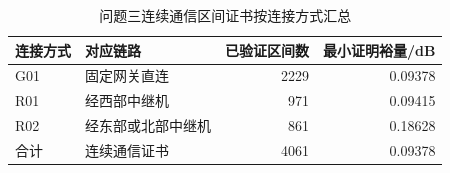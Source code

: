 \begin{table}[H]\centering\small
\caption{问题三连续通信区间证书按连接方式汇总}\label{tab:q3_communication}
\begin{tabular}{llrr}
\toprule
连接方式 & 对应链路 & 已验证区间数 & 最小证明裕量/dB\\\midrule
G01 & 固定网关直连 & 2229 & 0.09378\\
R01 & 经西部中继机 & 971 & 0.09415\\
R02 & 经东部或北部中继机 & 861 & 0.18628\\
合计 & 连续通信证书 & 4061 & 0.09378\\
\bottomrule\end{tabular}
\end{table}
